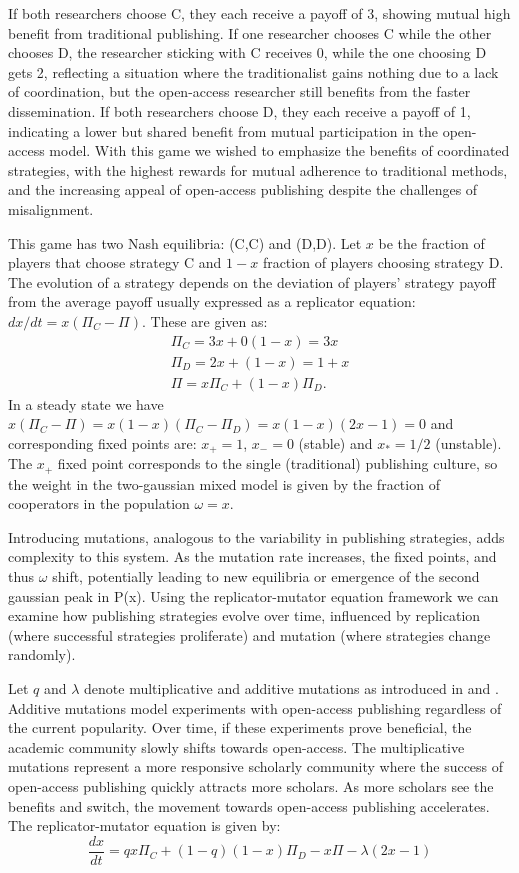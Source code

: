 \documentclass[amsfonts, amssymb, prl, superscriptaddress, notitlepage, twocolumn, nofootinbib]{revtex4-2}
\begin{document}
 If both researchers choose C, they each receive a payoff of 3, showing mutual high benefit from traditional publishing. If one researcher chooses C while the other chooses D, the researcher sticking with C receives 0, while the one choosing D gets 2, reflecting a situation where the traditionalist gains nothing due to a lack of coordination, but the open-access researcher still benefits from the faster dissemination. If both researchers choose D, they each receive a payoff of 1, indicating a lower but shared benefit from mutual participation in the open-access model. With this game we wished to emphasize the benefits of coordinated strategies, with the highest rewards for mutual adherence to traditional methods, and the increasing appeal of open-access publishing despite the challenges of misalignment.

This game has two Nash equilibria: (C,C) and (D,D). Let $x$ be the fraction of players that choose strategy C and $1-x$ fraction of players choosing strategy D. The evolution of a strategy depends on the deviation of players' strategy payoff from the average payoff usually expressed as a replicator equation: $dx/dt = x(\Pi_C-\Pi)$. These are given as:
\begin{eqnarray}
    \Pi_C = 3x + 0(1-x) = 3x \\
    \Pi_D = 2x + (1-x) = 1+x \\
    \Pi = x\Pi_C + (1-x)\Pi_D.
\end{eqnarray}
In a steady state we have $x(\Pi_C-\Pi)=x(1-x)(\Pi_C-\Pi_D)=x(1-x)(2x-1)=0$ and corresponding fixed points are: $x_+=1$, $x_-=0$ (stable) and $x_* = 1/2$ (unstable). The $x_+$ fixed point corresponds to the single (traditional) publishing culture, so the weight in the two-gaussian mixed model is given by the fraction of cooperators in the population $\omega=x$. 

Introducing mutations, analogous to the variability in publishing strategies, adds complexity to this system. As the mutation rate increases, the fixed points, and thus $\omega$ shift, potentially leading to new equilibria or emergence of the second gaussian peak in P(x). Using the replicator-mutator equation framework we can examine how publishing strategies evolve over time, influenced by replication (where successful strategies proliferate) and mutation (where strategies change randomly). 

Let $q$ and $\lambda$ denote multiplicative and additive mutations as introduced in \cite{mobilia2010oscillatory} and \cite{mittal2020evolutionary}. Additive mutations model experiments with open-access publishing regardless of the current popularity. Over time, if these experiments prove beneficial, the academic community slowly shifts towards open-access. The multiplicative mutations represent a more responsive scholarly community where the success of open-access publishing quickly attracts more scholars. As more scholars see the benefits and switch, the movement towards open-access publishing accelerates. The replicator-mutator equation is given by:
\begin{equation}
    \frac{dx}{dt} = qx\Pi_C+(1-q)(1-x)\Pi_D-x\Pi-\lambda(2x-1)
\end{equation}
\end{document}
